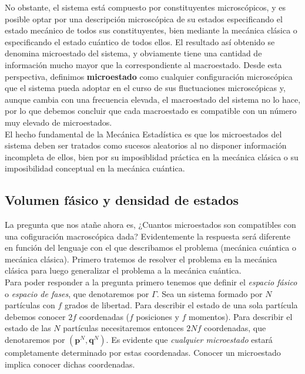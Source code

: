 \documentclass[12pt,a4paper]{article}
\numberwithin{equation}{section}
\numberwithin{figure}{section}
\newcommand{\pn}{\mathbf{p}}
\newcommand{\qn}{\mathbf{q}}
\theoremstyle{definition}
\begin{document}
No obstante, el sistema está compuesto por constituyentes microscópicos, y es posible optar por una descripción microscópica de su estados especificando el estado mecánico de todos sus constituyentes, bien mediante la mecánica clásica o especificando el estado cuántico de todos ellos. El resultado así obtenido se denomina microestado del sistema, y obviamente tiene una cantidad de información mucho mayor que la correspondiente al macroestado. Desde esta perspectiva, definimos \textbf{microestado} como cualquier configuración microscópica que el sistema pueda adoptar en el curso de sus fluctuaciones microscópicas y, aunque cambia con una frecuencia elevada, el macroestado del sistema no lo hace, por lo que debemos concluir que cada macroestado es compatible con un número muy elevado de microestados. \\

El hecho fundamental de la Mecánica Estadística es que los microestados del sistema deben ser tratados como sucesos aleatorios al no disponer información incompleta de ellos, bien por su imposiblidad práctica en la mecánica clásica o su imposibilidad conceptual en la mecánica cuántica. 

\subsection{Volumen fásico y densidad de estados}

La pregunta que nos atañe ahora es, ¿Cuantos microestados son compatibles con una cofiguración macroscópica dada? Evidentemente la respuesta será diferente en función del lenguaje con el que describamos el problema (mecánica cuántica o mecánica clásica). Primero tratemos de resolver el problema en la mecánica clásica para luego generalizar el problema a la mecánica cuántica. \\

Para poder responder a la pregunta primero tenemos que definir el \textit{espacio fásico} o \textit{espacio de fases}, que denotaremos por $\Gamma$. Sea un sistema formado por $N$ partículas con $f$ grados de libertad. Para describir el estado de una sola partícula debemos conocer $2f$ coordenadas ($f$ posiciones y $f$ momentos). Para describir el estado de las $N$ partículas necesitaremos entonces $2Nf$ coordenadas, que denotaremos por $(\pn^N,\qn^N)$. Es evidente que \textit{cualquier microestado} estará completamente determinado por estas coordenadas. Conocer un microestado implica conocer dichas coordenadas. \\
\end{document}

